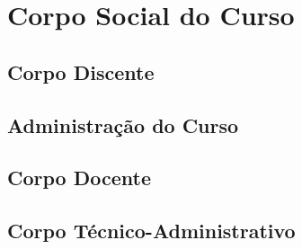 \newpage
\section{Corpo Social do Curso}

\subsection{Corpo Discente}


\subsection{Administra\c{c}\~ao do Curso}


\subsection{Corpo Docente}


\subsection{Corpo T\'ecnico-Administrativo}
